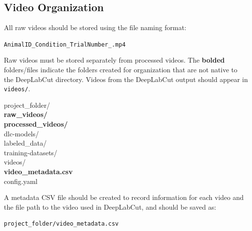 \documentclass[11pt]{article}
\renewcommand{\[}{%
  \par\smallskip\noindent
  \begin{center}%
  \setlength{\fboxsep}{5pt}%
  \setlength{\fboxrule}{0.35pt}%
  \begin{lrbox}{\almaEquationBox}%
  $\displaystyle
}
\renewcommand{\]}{%
  $%
  \end{lrbox}%
  \fcolorbox{equationLine}{equationBack}{\usebox{\almaEquationBox}}%
  \end{center}%
  \smallskip\par
}
\begin{document}
\subsection{Video Organization}

All raw videos should be stored using the file naming format:

\begin{tcolorbox}
\texttt{AnimalID\_Condition\_TrialNumber\_.mp4}
\end{tcolorbox}


Raw videos must be stored separately from processed videos. The \textbf{bolded} folders/files indicate the folders created for organization that are not native to the DeepLabCut directory. Videos from the DeepLabCut output should appear in \texttt{videos/}.  

\begin{tcolorbox}[data callout, title=\textbf{Proposed Project Directory}]
\ttfamily
project\_folder/\\
\hspace*{1em}\textbf{raw\_videos/}\\
\hspace*{1em}\textbf{processed\_videos/}\\
\hspace*{1em}dlc-models/\\
\hspace*{1em}labeled\_data/\\
\hspace*{1em}training-datasets/\\
\hspace*{1em}videos/\\
\hspace*{1em}\textbf{video\_metadata.csv}\\
\hspace*{1em}config.yaml
\end{tcolorbox}

\noindent A metadata CSV file should be created to record information for each video and the file path to the video used in DeepLabCut, and should be saved as:

\begin{tcolorbox}
\texttt{project\_folder/video\_metadata.csv}
\end{tcolorbox} 
\end{document}
